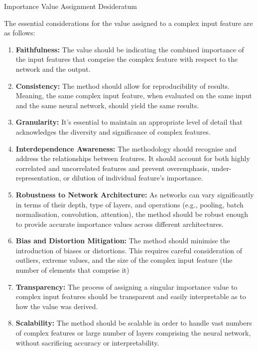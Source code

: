 \begin{Desideratum}{Importance Value Assignment Desideratum}

The essential considerations for the value assigned to a complex input feature are as follows:
\begin{enumerate}
    \item \textbf{Faithfulness:} The value should be indicating the combined importance of the input features that comprise the complex feature with respect to the network and the output.
    \item \textbf{Consistency:} The method should allow for reproducibility of results. Meaning, the same complex input feature, when evaluated on the same input and the same neural network, should yield the same results.
    \item \textbf{Granularity:} It's essential to maintain an appropriate level of detail that acknowledges the diversity and significance of complex features. 
    \item \textbf{Interdependence Awareness:} The methodology should recognise and address the relationships between features. It should account for both highly correlated and uncorrelated features and prevent overemphasis, under-representation, or dilution of individual feature's importance.
    \item \textbf{Robustness to Network Architecture:} As networks can vary significantly in terms of their depth, type of layers, and operations (e.g., pooling, batch normalisation, convolution, attention), the method should be robust enough to provide accurate importance values across different architectures.
    \item \textbf{Bias and Distortion Mitigation:} The method should minimise the introduction of biases or distortions. This requires careful consideration of outliers, extreme values, and the size of the complex input feature (\ie the number of elements that comprise it)
    \item \textbf{Transparency:} The process of assigning a singular importance value to complex input features should be transparent and easily interpretable as to how the value was derived.
    \item \textbf{Scalability:} The method should be scalable in order to handle vast numbers of complex features or large number of layers comprising the neural network, without sacrificing accuracy or interpretability.
\end{enumerate}  
\end{Desideratum}

